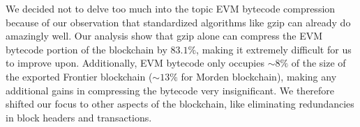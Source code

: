 We decided not to delve too much into the topic EVM bytecode compression because of our observation that standardized
algorithms like gzip can already do amazingly well. Our analysis show that gzip alone can compress the EVM bytecode
portion of the blockchain by $83.1\%$, making it extremely difficult for us to improve upon.
Additionally, EVM bytecode only occupies $\sim8\%$ of the size of the exported Frontier blockchain ($\sim 13\%$ for Morden blockchain),
making any additional gains in compressing the bytecode very insignificant.
We therefore shifted our focus to other aspects of the blockchain, like eliminating redundancies in block headers
and transactions.
